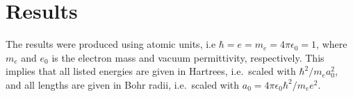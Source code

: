 \chapter{Results}

The results were produced using atomic units, i.e $\hbar=e=m_e=4\pi\epsilon_0 = 1$, where $m_e$ and $e_0$ is the electron mass and vacuum permittivity, respectively. This implies that all listed energies are given in Hartrees, i.e.~scaled with $\hbar^2/m_ea_0^2$, and all lengths are given in Bohr radii, i.e.~scaled with $a_0=4\pi\epsilon_0\hbar^2/m_e e^2$.








 
 

 
 
 



